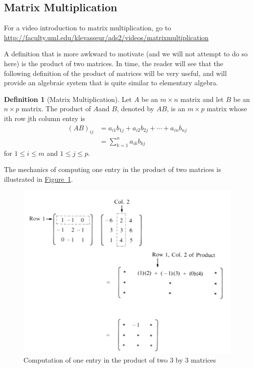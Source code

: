 \documentclass[10pt,]{book}
\theoremstyle{plain}
\theoremstyle{definition}
\newtheorem{definition}[theorem]{Definition}
\theoremstyle{definition}
\theoremstyle{definition}
\theoremstyle{definition}
\begin{document}
\subsection[Matrix Multiplication]{Matrix Multiplication}\label{ss-matrix-multiplication}
For a video introduction to matrix multiplication, go to  \href{http://faculty.uml.edu/klevasseur/ads2/videos/matrixmultiplication}{http://faculty.uml.edu/klevasseur/ads2/videos/matrixmultiplication}
%
\par
A definition that is more awkward to motivate (and we will not attempt to do so here) is the product of two matrices. In time, the reader will see that the following definition of the product of matrices will be very useful, and will provide an algebraic system that is quite similar to elementary algebra.%
\begin{definition}[Matrix Multiplication]\label{def-matrix-multiplication}
Let \(A\) be an \(m\times n\) matrix and let \(B\) be an \(n\times p\) matrix. The product of \(A\)and \(B\), denoted
by \(AB\), is an \(m\times p\) matrix whose ith row jth column entry is
\begin{equation*}\begin{split}
(A B)_{ij}&= a_{i 1}b_{1 j}+a_{i 2}b_{2 j}+ \cdots +a_{i n}b_{n j}\\
&= \sum_{k=1}^n a_{i k} b_{k j}
\end{split}
\end{equation*}
for \(1\leq i\leq m\) and \(1\leq j\leq p\).%
\end{definition}
\par
The mechanics of computing one entry in the product of two matrices is illustrated in \hyperref[fig-one-matrix-product-entry]{Figure~\ref{fig-one-matrix-product-entry}}.%
\leavevmode%
\begin{figure}
\centering
\includegraphics[width=1\linewidth]{images/fig-one-matrix-product-entry.png}
\caption{Computation of one entry in the product of two 3 by 3 matrices
                \label{fig-one-matrix-product-entry}}
\end{figure}
\end{document}
